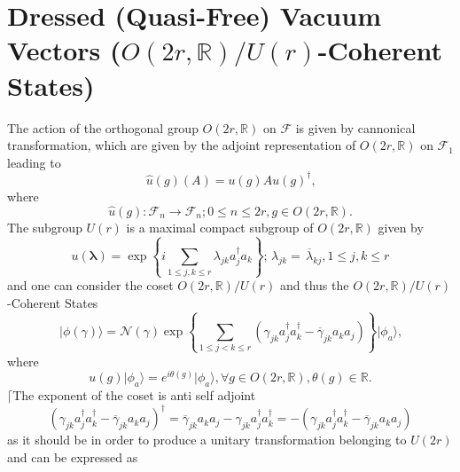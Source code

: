 \documentclass[aps, preprint]{revtex4}
\begin{document}
\section{Dressed (Quasi-Free) Vacuum Vectors ($O \left (2 r ,\mathbb{R}\right )/U \left (r\right )$-Coherent States)}
The action of the orthogonal group $O \left (2 r ,\mathbb{R}\right )$ on $\mathcal{F}$ is given by cannonical transformation, which are given by the adjoint representation of $O \left (2 r ,\mathbb{R}\right )$ on $\mathcal{F}_{1}$ leading to
\begin{equation}\widehat{u} \left (g\right ) \left (A\right ) =u \left (g\right ) A u \left (g\right )^{ \dag }\text{,}
\end{equation}where
\begin{equation}\widehat{u} \left (g\right ) :\mathcal{F}_{n} \rightarrow \mathcal{F}_{n} ;0 \leq n \leq 2 r ,g \in O \left (2 r ,\mathbb{R}\right )\text{.}
\end{equation}The subgroup $U \left (r\right )$ is a maximal compact subgroup of $O \left (2 r ,\mathbb{R}\right )$ given by
\begin{equation}u \left (\mathbf{\lambda }\right ) =\exp  \left \{i \sum _{1 \leq j ,k \leq r}\lambda _{j k} a_{j}^{ \dag } a_{k}\right \} ;\,\lambda _{j k} =\,\overline{\lambda }_{k j} ,1 \leq j ,k \leq r
\end{equation}and one can consider the coset $O \left (2 r ,\mathbb{R}\right )/U \left (r\right )$ and thus the $O \left (2 r ,\mathbb{R}\right )/U \left (r\right )$-Coherent States
\begin{equation}\vert \phi  \left (\gamma \right ) \rangle  =\mathcal{N} \left (\gamma \right ) \exp  \left \{\sum _{1 \leq j <k \leq r}\left (\gamma _{j k} a_{j}^{ \dag } a_{k}^{ \dag } -\overline{\gamma }_{j k} a_{k} a_{j}\right )\right \}\vert \phi _{a} \rangle \text{,}
\end{equation}where
\begin{equation}u \left (g\right )\vert \phi _{a} \rangle  =e^{i \theta  \left (g\right )}\vert \phi _{a} \rangle  , \forall g \in O \left (2 r ,\mathbb{R}\right ) ,\theta  \left (g\right ) \in \mathbb{R}\text{.}
\end{equation}$\lceil $The exponent of the coset is anti self adjoint
\begin{equation}\left (\gamma _{j k} a_{j}^{ \dag } a_{k}^{ \dag } -\overline{\gamma }_{j k} a_{k} a_{j}\right )^{ \dag } =\overline{\gamma }_{j k} a_{k} a_{j} -\gamma _{j k} a_{j}^{ \dag } a_{k}^{ \dag } = -\left (\gamma _{j k} a_{j}^{ \dag } a_{k}^{ \dag } -\overline{\gamma }_{j k} a_{k} a_{j}\right )
\end{equation}as it should be in order to produce a unitary transformation belonging to $U \left (2 r\right )$ and can be expressed as
\end{document}
